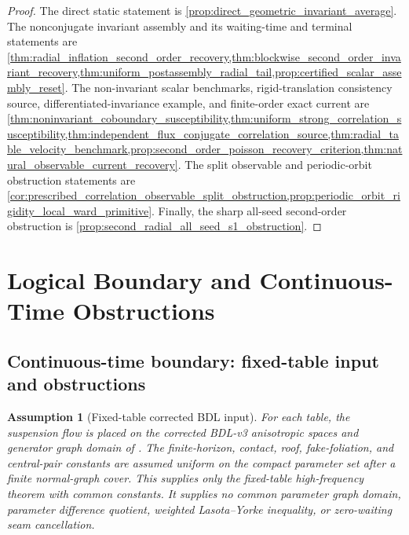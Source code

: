 \documentclass[11pt]{amsart}
\theoremstyle{compactplain}
\theoremstyle{compactdefinition}
\newtheorem{assumption}[theorem]{Assumption}
\theoremstyle{compactremark}
\begin{document}
\begin{proof}
The direct static statement is
\cref{prop:direct_geometric_invariant_average}.  The nonconjugate invariant
assembly and its waiting-time and terminal statements are
\cref{thm:radial_inflation_second_order_recovery,thm:blockwise_second_order_invariant_recovery,thm:uniform_postassembly_radial_tail,prop:certified_scalar_assembly_reset}.
The non-invariant scalar benchmarks, rigid-translation consistency source,
differentiated-invariance example, and
finite-order exact current are
\cref{thm:noninvariant_coboundary_susceptibility,thm:uniform_strong_correlation_susceptibility,thm:independent_flux_conjugate_correlation_source,thm:radial_table_velocity_benchmark,prop:second_order_poisson_recovery_criterion,thm:natural_observable_current_recovery}.
The split observable and periodic-orbit obstruction statements are
\cref{cor:prescribed_correlation_observable_split_obstruction,prop:periodic_orbit_rigidity_local_ward_primitive}.
Finally, the sharp all-seed second-order obstruction is
\cref{prop:second_radial_all_seed_s1_obstruction}.
\end{proof}


\section{Logical Boundary and Continuous-Time Obstructions}
\label{sec:main_response_package}


\subsection{Continuous-time boundary: fixed-table input and obstructions}

\begin{assumption}[Fixed-table corrected BDL input]
\label{ass:uniform_bdl_v3_family}
For each table, the suspension flow is placed on the corrected BDL-v3
anisotropic spaces and generator graph domain of
\cite{BaladiDemersLiverani2018}.  The finite-horizon, contact, roof,
fake-foliation, and central-pair constants are assumed uniform on the compact
parameter set after a finite normal-graph cover.  This supplies only the
fixed-table high-frequency theorem with common constants.  It supplies no
common parameter graph domain, parameter difference quotient, weighted
Lasota--Yorke inequality, or zero-waiting seam cancellation.
\end{assumption}
\end{document}
